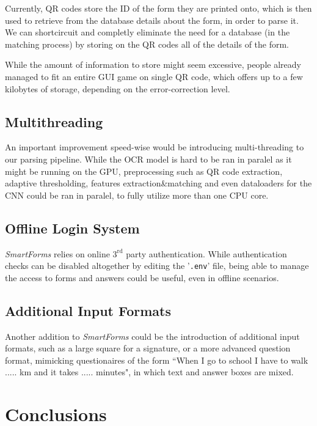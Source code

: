 \documentclass[11pt, a4paper]{report}
\def\code#1{\texttt{#1}}
\begin{document}
Currently, QR codes store the ID of the form they are printed onto, which is then used to retrieve from the database details about the form, in order to parse it. We can shortcircuit and completly eliminate the need for a database (in the matching process) by storing on the QR codes all of the details of the form.

While the amount of information to store might seem excessive, people already managed to fit an entire GUI game on single QR code\cite{game-qr-code}, which offers up to a few kilobytes of storage, depending on the error-correction level.

\subsection{Multithreading}

An important improvement speed-wise would be introducing multi-threading to our parsing pipeline. While the OCR model is hard to be ran in paralel as it might be running on the GPU, preprocessing such as QR code extraction, adaptive thresholding, features extraction\&matching and even dataloaders for the CNN could be ran in paralel, to fully utilize more than one CPU core. 


\subsection{Offline Login System}

\textit{SmartForms} relies on online $3^\textrm{rd}$ party authentication. While authentication checks can be disabled altogether by editing the '\code{.env}' file, being able to manage the access to forms and answers could be useful, even in offline scenarios.

\subsection{Additional Input Formats}

Another addition to \textit{SmartForms} could be the introduction of additional input formats, such as a large square for a signature, or a more advanced question format, mimicking questionaires of the form ``When I go to school I have to walk ..... km and it takes ..... minutes", in which text and answer boxes are mixed.

\section{Conclusions}
\end{document}
